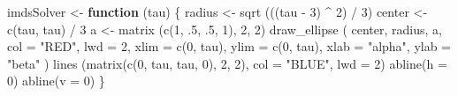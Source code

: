 \documentclass[
  12pt,
]{book}
\newenvironment{Shaded}{\begin{snugshade}}{\end{snugshade}}
\newcommand{\AttributeTok}[1]{\textcolor[rgb]{0.77,0.63,0.00}{#1}}
\newcommand{\ControlFlowTok}[1]{\textcolor[rgb]{0.13,0.29,0.53}{\textbf{#1}}}
\newcommand{\DecValTok}[1]{\textcolor[rgb]{0.00,0.00,0.81}{#1}}
\newcommand{\FunctionTok}[1]{\textcolor[rgb]{0.00,0.00,0.00}{#1}}
\newcommand{\NormalTok}[1]{#1}
\newcommand{\OtherTok}[1]{\textcolor[rgb]{0.56,0.35,0.01}{#1}}
\newcommand{\SpecialCharTok}[1]{\textcolor[rgb]{0.00,0.00,0.00}{#1}}
\newcommand{\StringTok}[1]{\textcolor[rgb]{0.31,0.60,0.02}{#1}}
\theoremstyle{definition}
\theoremstyle{definition}
\theoremstyle{definition}
\theoremstyle{definition}
\theoremstyle{remark}
\begin{document}
\begin{Shaded}
\begin{Highlighting}[]
\NormalTok{imdsSolver }\OtherTok{\textless{}{-}} \ControlFlowTok{function}\NormalTok{ (tau) \{}
\NormalTok{  radius }\OtherTok{\textless{}{-}} \FunctionTok{sqrt}\NormalTok{ (((tau }\SpecialCharTok{{-}} \DecValTok{3}\NormalTok{) }\SpecialCharTok{\^{}} \DecValTok{2}\NormalTok{) }\SpecialCharTok{/} \DecValTok{3}\NormalTok{)}
\NormalTok{  center }\OtherTok{\textless{}{-}} \FunctionTok{c}\NormalTok{(tau, tau) }\SpecialCharTok{/} \DecValTok{3}
\NormalTok{  a }\OtherTok{\textless{}{-}} \FunctionTok{matrix}\NormalTok{ (}\FunctionTok{c}\NormalTok{(}\DecValTok{1}\NormalTok{, .}\DecValTok{5}\NormalTok{, .}\DecValTok{5}\NormalTok{, }\DecValTok{1}\NormalTok{), }\DecValTok{2}\NormalTok{, }\DecValTok{2}\NormalTok{)}
  \FunctionTok{draw\_ellipse}\NormalTok{ (}
\NormalTok{    center,}
\NormalTok{    radius,}
\NormalTok{    a,}
    \AttributeTok{col =} \StringTok{"RED"}\NormalTok{,}
    \AttributeTok{lwd =} \DecValTok{2}\NormalTok{,}
    \AttributeTok{xlim =} \FunctionTok{c}\NormalTok{(}\DecValTok{0}\NormalTok{, tau),}
    \AttributeTok{ylim =} \FunctionTok{c}\NormalTok{(}\DecValTok{0}\NormalTok{, tau),}
    \AttributeTok{xlab =} \StringTok{"alpha"}\NormalTok{,}
    \AttributeTok{ylab =} \StringTok{"beta"}
\NormalTok{  )}
  \FunctionTok{lines}\NormalTok{ (}\FunctionTok{matrix}\NormalTok{(}\FunctionTok{c}\NormalTok{(}\DecValTok{0}\NormalTok{, tau, tau, }\DecValTok{0}\NormalTok{), }\DecValTok{2}\NormalTok{, }\DecValTok{2}\NormalTok{), }\AttributeTok{col =} \StringTok{"BLUE"}\NormalTok{, }\AttributeTok{lwd =} \DecValTok{2}\NormalTok{)}
  \FunctionTok{abline}\NormalTok{(}\AttributeTok{h =} \DecValTok{0}\NormalTok{)}
  \FunctionTok{abline}\NormalTok{(}\AttributeTok{v =} \DecValTok{0}\NormalTok{)}
\NormalTok{\}}


\end{Highlighting}
\end{Shaded}
\end{document}
